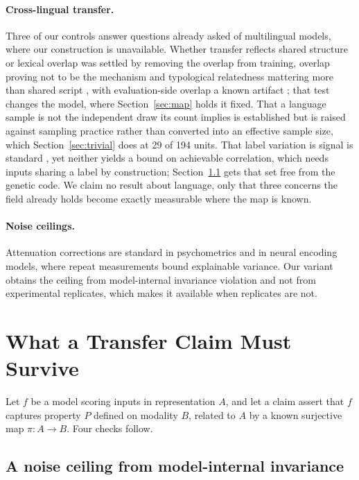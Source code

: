 \documentclass[11pt]{article}
\begin{document}
\paragraph{Cross-lingual transfer.} Three of our controls answer questions already
asked of multilingual models, where our construction is unavailable. Whether
transfer reflects shared structure or lexical overlap was settled by removing the
overlap from training, overlap proving not to be the mechanism
\citep{conneau2020emerging,karthikeyan2020crosslingual} and typological
relatedness mattering more than shared script \citep{pires2019multilingual}, with
evaluation-side overlap a known artifact \citep{artetxe2020translation}; that test
changes the model, where Section~\ref{sec:map} holds it fixed. That a language
sample is not the independent draw its count implies is established
\citep{ploeger2026principled} but is raised against sampling practice rather than
converted into an effective sample size, which Section~\ref{sec:trivial} does at
29 of 194 units. That label variation is signal is standard
\citep{plank2022problem,pavlick2019inherent}, yet neither yields a bound on
achievable correlation, which needs inputs sharing a label by construction;
Section~\ref{sec:ceiling} gets that set free from the genetic code. We claim no
result about language, only that three concerns the field already holds become
exactly measurable where the map is known.

\paragraph{Noise ceilings.} Attenuation corrections are standard in psychometrics
and in neural encoding models, where repeat measurements bound explainable
variance. Our variant obtains the ceiling from model-internal invariance violation
and not from experimental replicates, which makes it available when replicates
are not.

\section{What a Transfer Claim Must Survive}
\label{sec:controls}

Let $f$ be a model scoring inputs in representation $A$, and let a claim assert
that $f$ captures property $P$ defined on modality $B$, related to $A$ by a known
surjective map $\pi: A \to B$. Four checks follow.

\subsection{A noise ceiling from model-internal invariance}
\label{sec:ceiling}
\end{document}
